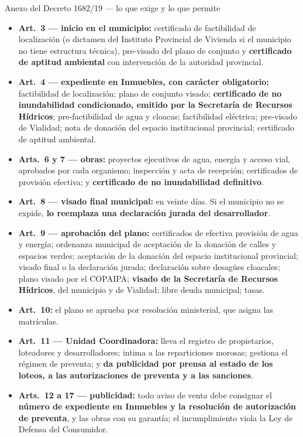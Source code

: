 \begin{ficha}{Anexo del Decreto 1682/19 --- lo que exige y lo que permite}
\begin{itemize}[leftmargin=*,nosep]
\item \textbf{Art.\ 3 --- inicio en el municipio:} certificado de factibilidad de localización (o dictamen del Instituto Provincial de Vivienda si el municipio no tiene estructura técnica), pre-visado del plano de conjunto y \textbf{certificado de aptitud ambiental} con intervención de la autoridad provincial.
\item \textbf{Art.\ 4 --- expediente en Inmuebles, con carácter obligatorio:} factibilidad de localización; plano de conjunto visado; \textbf{certificado de no inundabilidad condicionado, emitido por la Secretaría de Recursos Hídricos}; pre-factibilidad de agua y cloacas; factibilidad eléctrica; pre-visado de Vialidad; nota de donación del espacio institucional provincial; certificado de aptitud ambiental.
\item \textbf{Arts.\ 6 y 7 --- obras:} proyectos ejecutivos de agua, energía y acceso vial, aprobados por cada organismo; inspección y acta de recepción; certificados de provisión efectiva; y \textbf{certificado de no inundabilidad definitivo}.
\item \textbf{Art.\ 8 --- visado final municipal:} en veinte días. Si el municipio no se expide, \textbf{lo reemplaza una declaración jurada del desarrollador}.
\item \textbf{Art.\ 9 --- aprobación del plano:} certificados de efectiva provisión de agua y energía; ordenanza municipal de aceptación de la donación de calles y espacios verdes; aceptación de la donación del espacio institucional provincial; visado final o la declaración jurada; declaración sobre desagües cloacales; plano visado por el COPAIPA; \textbf{visado de la Secretaría de Recursos Hídricos}, del municipio y de Vialidad; libre deuda municipal; tasas.
\item \textbf{Art.\ 10:} el plano se aprueba por resolución ministerial, que asigna las matrículas.
\item \textbf{Art.\ 11 --- Unidad Coordinadora:} lleva el registro de propietarios, loteadores y desarrolladores; intima a las reparticiones morosas; gestiona el régimen de preventa; y \textbf{da publicidad por prensa al estado de los loteos, a las autorizaciones de preventa y a las sanciones}.
\item \textbf{Arts.\ 12 a 17 --- publicidad:} todo aviso de venta debe consignar el \textbf{número de expediente en Inmuebles y la resolución de autorización de preventa}, y las obras con su garantía; el incumplimiento viola la Ley de Defensa del Consumidor.

\end{itemize}
\end{ficha}
